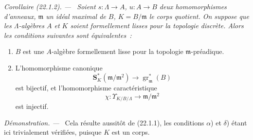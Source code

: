 \documentclass[10pt,oneside]{book}
\makeatletter
\newcommand{\setmanualcurrentlabel}[1]{\def\@currentlabel{#1}}
\newenvironment{corollary}[1][]{%
  \setmanualcurrentlabel{#1}\par\medskip\noindent\itshape Corollaire (#1). ---\ }{\par}
\newenvironment{proof}{%
  \par\medskip\noindent\textit{Démonstration. ---\ }}{\par}
\makeatother
\begin{document}
\begin{corollary}[22.1.2]
\label{0.22.1.2-fr}
Soient $s:\Lambda\to A$, $u:A\to B$ deux homomorphismes d'anneaux,
$\mathfrak m$ un idéal maximal de $B$, $K=B/\mathfrak m$ le corps quotient.
On suppose que les $\Lambda$-algèbres $A$ et $K$ soient formellement lisses
pour la topologie discrète. Alors les conditions suivantes sont
équivalentes~:
\begin{enumerate}
  \item[a)] $B$ est une $A$-algèbre formellement lisse pour la topologie
  $\mathfrak m$-préadique.
  \item[b)] L'homomorphisme canonique
  \begin{equation}
  \tag{22.1.2.1}
  \label{0.22.1.2.1-fr}
    \mathbf S_K^*(\mathfrak m/\mathfrak m^2)
    \longrightarrow\operatorname{gr}_{\mathfrak m}^*(B)
  \end{equation}
  est bijectif, et l'homomorphisme caractéristique
  \begin{equation}
  \tag{22.1.2.2}
  \label{0.22.1.2.2-fr}
    \chi:\Upsilon_{K/B/\Lambda}\longrightarrow\mathfrak m/\mathfrak m^2
  \end{equation}
  est injectif.
\end{enumerate}
\end{corollary}

\begin{proof}
Cela résulte aussitôt de (22.1.1), les conditions $\alpha$) et $\delta$)
étant ici trivialement vérifiées, puisque $K$ est un corps.
\end{proof}
\end{document}
